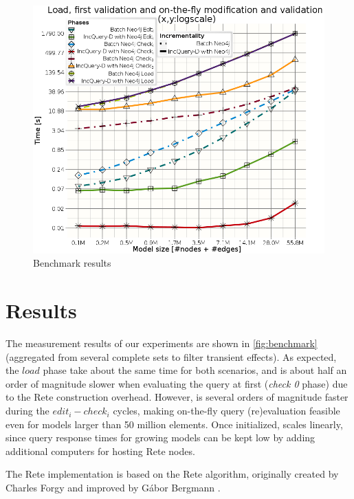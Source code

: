 \begin{figure}
\begin{center}
\includegraphics[width=\columnwidth]{figures/All_RouteSensor}
\caption{Benchmark results}
\label{fig:benchmark}
\end{center}
\end{figure}

\section{Results}
\label{benchmark_results}\label{analysis}

The measurement results of our experiments are shown in \autoref{fig:benchmark} (aggregated from several complete sets to filter transient effects). As expected, the $load$ phase take about the same time for both scenarios, and \iqd{} is about half an order of magnitude slower when evaluating the query at first (\textit{check 0} phase) due to the Rete construction overhead. However, \iqd{} is several orders of magnitude faster during the $edit_i - check_i$ cycles, making on-the-fly query (re)evaluation feasible even for models larger than 50 million elements. Once initialized, \iqd{} scales linearly, since query response times for growing models can be kept low by adding additional computers for hosting Rete nodes.

The Rete implementation is based on the Rete algorithm, originally created by Charles Forgy \cite{Forgy} and improved by Gábor Bergmann \cite{BergmannRete}.

